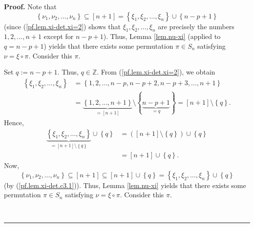 \documentclass
[numbers=enddot,12pt,final,onecolumn,notitlepage,english]{scrartcl}%
\theoremstyle{definition}
\newenvironment{proof}[1][Proof]{\noindent\textbf{#1.} }{\ \rule{0.5em}{0.5em}}
\newenvironment{verlong}{}{}
\newenvironment{vershort}{}{}
\begin{document}
\begin{proof}
\begin{vershort}
Note that%
\[
\left\{  \nu_{1},\nu_{2},\ldots,\nu_{n}\right\}  \subseteq\left[  n+1\right]
=\left\{  \xi_{1},\xi_{2},\ldots,\xi_{n}\right\}  \cup\left\{  n-p+1\right\}
\]
(since (\ref{pf.lem.xi-det.xi=2}) shows that $\xi_{1},\xi_{2},\ldots,\xi_{n}$
are precisely the numbers $1,2,\ldots,n+1$ except for $n-p+1$). Thus, Lemma
\ref{lem.nu-xi} (applied to $q=n-p+1$) yields that there exists some
permutation $\pi\in S_{n}$ satisfying $\nu=\xi\circ\pi$. Consider this $\pi$.
\end{vershort}

\begin{verlong}
Set $q:=n-p+1$. Thus, $q\in\mathbb{Z}$. From (\ref{pf.lem.xi-det.xi=2}), we
obtain%
\begin{align*}
\left\{  \xi_{1},\xi_{2},\ldots,\xi_{n}\right\}   &  =\left\{  1,2,\ldots
,n-p,n-p+2,n-p+3,\ldots,n+1\right\} \\
&  =\underbrace{\left\{  1,2,\ldots,n+1\right\}  }_{=\left[  n+1\right]
}\setminus\left\{  \underbrace{n-p+1}_{=q}\right\}  =\left[  n+1\right]
\setminus\left\{  q\right\}  .
\end{align*}
Hence,%
\begin{align}
\underbrace{\left\{  \xi_{1},\xi_{2},\ldots,\xi_{n}\right\}  }_{=\left[
n+1\right]  \setminus\left\{  q\right\}  }\cup\left\{  q\right\}   &  =\left(
\left[  n+1\right]  \setminus\left\{  q\right\}  \right)  \cup\left\{
q\right\} \nonumber\\
&  =\left[  n+1\right]  \cup\left\{  q\right\}  . \label{pf.lem.xi-det.c3.1}%
\end{align}
Now,
\[
\left\{  \nu_{1},\nu_{2},\ldots,\nu_{n}\right\}  \subseteq\left[  n+1\right]
\subseteq\left[  n+1\right]  \cup\left\{  q\right\}  =\left\{  \xi_{1},\xi
_{2},\ldots,\xi_{n}\right\}  \cup\left\{  q\right\}
\]
(by (\ref{pf.lem.xi-det.c3.1})). Thus, Lemma \ref{lem.nu-xi} yields that there
exists some permutation $\pi\in S_{n}$ satisfying $\nu=\xi\circ\pi$. Consider
this $\pi$.
\end{verlong}


\end{proof}
\end{document}
